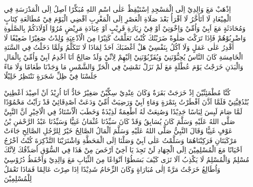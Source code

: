 \begin{twocol}
\begin{rightcol}
اِذْهَبْ مَعَ وَالِدِيْ اِلَى الْمَسْجِدِ اِسْتَيْقِظْ عَلٰى اسْمِ اللهِ مُبَكِّرًا اَصِلُ اِلَى الْمَدْرَسَةِ فِي الْمِيْعَادِ لَا اَتَأَخَّرُ لَا اَقْرَأُ بَعْدَ صَلَاةِ الْعَصْرِ اِلَى الْمَغْرِبِ اَقْضِي الْيَوْمَ فِيْ مُطَالَعَةِ كِتَابٍ وَمُحَادَثَةٍ مَعَ اَبِيْ وَاُمِّيْ وَاِخْوَتِيْ اَوْ فِيْ زِيَارَةِ قَرِيْبٍ اَوْ عِيَادَةِ مَرِيْضٍ مُرُوْا اَوْلَادَكُمْ بِالصَّلٰوةِ وَاضْرِبُوْهُمْ فَاِذَا تَرَكْتَ صَلٰوةً ضَرَبْتُكَ كُنْتُ تَعَلَّمْتُ كَثِيْرًا مِنَ الْاَدْعِيَةِ وُلِدْتُ صَغِيْرًا ضَعِيْفًا لَا اَقْدِرُ عَلٰى عَمَلٍ وَلَا آكُلُ بِنَفْسِيْ هَلْ اَغْضَبَكَ اَحَدٌ لِمَاذَا لَا تَتَكَلَّمُ وَلَمَّا دَخَلْتُ فِي السَّنَةِ الْخَامِسَةِ كَانَ النَّاسُ يُحِبُّوْنَنِيْ وَيُقَرِّبُوْنَنِيْ اِلَيْهِمْ لِاَنِّيْ وَلَدٌ صَالِحٌ اَنَا اَخْدِمُ اَبِيْ وَاُمِّيْ بِالْمَالِ وَالْبَدَنِ خَرَجْتُ يَوْمَ عُطْلَةٍ مَعَ  لَمْ نَزَلْ نَمْشِيْ فِي الْحَرِّ وَالشَّمْسِ مَا وَجَدْنَا طَعَامًا وَلَا مَاءً جَلَسْنَا فِيْ ظِلِّ شَجَرَةٍ نَنْتَظِرُ خَلِيْلًا
\par
\end{rightcol}
\begin{leftcol}
كُنَّا مُطْمَئِنِّيْنَ اِذْ خَرَجَتْ بَقَرَةٌ وَكَانَ عِنْدِيْ سِكِّيْنٌ صَغِيْرٌ حَادٌّ اَنَا اُرِيْدُ اَنْ اَصِيْدَ اَعْطِنِيْ بُنْدُقِيَّتِيْ فَلَمَّا اَذَّنَ اَفْطَرْتُ بِتَمْرَةٍ وَمَاءٍ  اَبِيْ وَرَضِيَتْ اُمِّيْ وَدَعَتْ اَصْدِقَائِيْ قَدْ رَاَيْتُ مَحْمُوْدًا لَمَّا صَامَ لَبِسَ لِبَاسًا جَدِيْدًا وَصُنِعَتْ لَهُ اَطْعِمَةٌ لَذِيْذَةٌ وَخَطَبَ الْاُسْتَاذُ فِي الْاَخِيْرِ اَنَّ النَّبِيَّ صَلَّى اللهُ عَلَيْهِ وَسَلَّمَ كَانَ يُسَابِقُ وَقَدْ كَانَ سَيِّدُنَا عُثْمَانُ غَنِيًّا وَسَيِّدُنَا عَبْدُ الرَّحْمٰنِ بْنُ عَوْفٍ غَنِيًّا وَقَالَ النَّبِيُّ صَلَّى اللهُ عَلَيْهِ وَسَلَّمَ اَلْمَالُ الصَّالِحُ خَيْرٌ لِلرَّجُلِ الصَّالِحِ جَاءَتْ مَرْكَبَتَانِ فَرَكِبْنَاهُمَا وَسَلَّمْتُ عَلٰى اَبِيْ وَصَلْنَا اِلَى الْمَحَطَّةِ وَاشْتَرَيْنَا التَّذْكِرَةَ كُنْتُ اَخْرُجُ اَحْيَانًا مَعَ الْمُسْلِمِيْنَ اِلَى الْجِهَادِ لَنْ تَجِدَ يَا اَخِيْ اَرْخَصَ مِنْ هٰذَا فِي السُّوْقِ اُصَدِّقُكَ لِاَنَّكَ مُسْلِمٌ وَالْمُسْلِمُ لَا يَكْذِبُ اَلَا تَرٰى كَيْفَ بَسَطُوْا اَنْوَاعًا مِنَ الثِّيَابِ  مَعَ وَالِدِيْ وَاَحْفَظُ دُرُوْسِيْ وَاُطَالِعُ خَرَجْتُ مَرَّةً اِلٰى مُبَارَاةٍ وَكَانَ الزِّحَامُ شَدِيْدًا اِذَا صِرْتَ عَالِمًا فَمَاذَا تَعْمَلُ لِلْمُسْلِمِيْنَ
\par
\end{leftcol}
\end{twocol}

